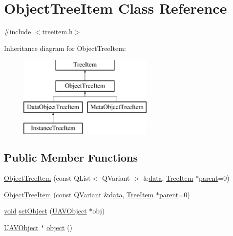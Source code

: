 \hypertarget{class_object_tree_item}{\section{\-Object\-Tree\-Item \-Class \-Reference}
\label{class_object_tree_item}
}


{\ttfamily \#include $<$treeitem.\-h$>$}

\-Inheritance diagram for \-Object\-Tree\-Item\-:\begin{figure}[H]
\begin{center}
\leavevmode
\includegraphics[height=4.000000cm]{class_object_tree_item}
\end{center}
\end{figure}
\subsection*{\-Public \-Member \-Functions}
\begin{DoxyCompactItemize}
\item 
\hyperlink{group___u_a_v_object_browser_plugin_ga5e60cc8ad10984411923efa677042087}{\-Object\-Tree\-Item} (const \-Q\-List$<$ \-Q\-Variant $>$ \&\hyperlink{group___u_a_v_object_browser_plugin_ga7c5708ae3cbba9c509f497c493beccb6}{data}, \hyperlink{class_tree_item}{\-Tree\-Item} $\ast$\hyperlink{group___u_a_v_object_browser_plugin_gaa3a7ba624312b6be70872634db291881}{parent}=0)
\item 
\hyperlink{group___u_a_v_object_browser_plugin_gafad6566ac62ae971f53230a0ec190070}{\-Object\-Tree\-Item} (const \-Q\-Variant \&\hyperlink{group___u_a_v_object_browser_plugin_ga7c5708ae3cbba9c509f497c493beccb6}{data}, \hyperlink{class_tree_item}{\-Tree\-Item} $\ast$\hyperlink{group___u_a_v_object_browser_plugin_gaa3a7ba624312b6be70872634db291881}{parent}=0)
\item 
\hyperlink{group___u_a_v_objects_plugin_ga444cf2ff3f0ecbe028adce838d373f5c}{void} \hyperlink{group___u_a_v_object_browser_plugin_ga5484d17e330931614680cfac5a1d1d3d}{set\-Object} (\hyperlink{class_u_a_v_object}{\-U\-A\-V\-Object} $\ast$obj)
\item 
\hyperlink{class_u_a_v_object}{\-U\-A\-V\-Object} $\ast$ \hyperlink{group___u_a_v_object_browser_plugin_gac539f66530cd71a2b0b562cb5e2accc7}{object} ()
\end{DoxyCompactItemize}


